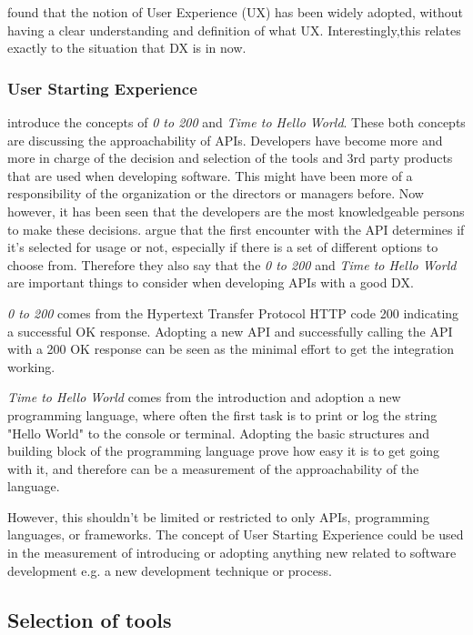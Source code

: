 \documentclass[english, 12pt, a4paper, sci, utf8, a-1b, online]{aaltothesis}
\begin{document}
\textcite{understanding-ux} found that the notion of User Experience (UX) has been widely adopted, without having a clear understanding and definition of what UX. Interestingly,this relates exactly to the situation that DX is in now.

\subsubsection{User Starting Experience}

\textcite{api-designers} introduce the concepts of \textit{0 to 200} and \textit{Time to Hello World}. These both concepts are discussing the approachability of APIs. Developers have become more and more in charge of the decision and selection of the tools and 3rd party products that are used when developing software. This might have been more of a responsibility of the organization or the directors or managers before. Now however, it has been seen that the developers are the most knowledgeable persons to make these decisions. \textcite{api-designers} argue that the first encounter with the API determines if it's selected for usage or not, especially if there is a set of different options to choose from. Therefore they also say that the \textit{0 to 200} and \textit{Time to Hello World} are important things to consider when developing APIs with a good DX.

\textit{0 to 200} comes from the Hypertext Transfer Protocol HTTP code 200 indicating a successful OK response. Adopting a new API and successfully calling the API with a 200 OK response can be seen as the minimal effort to get the integration working.

\textit{Time to Hello World} comes from the introduction and adoption a new programming language, where often the first task is to print or log the string "Hello World" to the console or terminal. Adopting the basic structures and building block of the programming language prove how easy it is to get going with it, and therefore can be a measurement of the approachability of the language.

However, this shouldn't be limited or restricted to only APIs, programming languages, or frameworks. The concept of User Starting Experience could be used in the measurement of introducing or adopting anything new related to software development e.g. a new development technique or process.

\subsection{Selection of tools}
\end{document}
